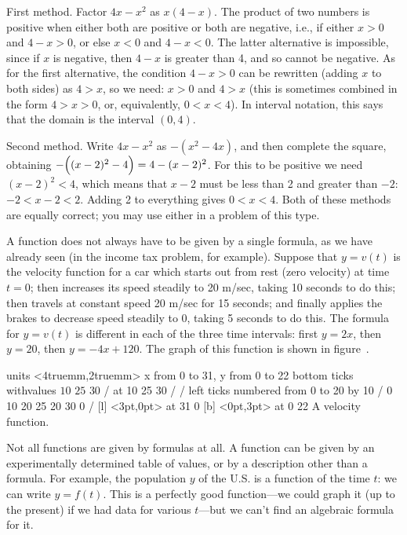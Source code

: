 {\txtbold First method.} Factor $4x-x^2$ as $x(4-x)$.  The product of two numbers
is positive when either both are positive or both are negative, i.e., if
either $x>0$ and $4-x>0$, or else $x<0$ and $4-x<0$.  The latter alternative
is impossible, since if $x$ is negative, then $4-x$ is greater than 4, and
so cannot be negative.  As for the first alternative, the condition $4-x>0$
can be rewritten (adding $x$ to both sides) as $4>x$, so we need:
$x>0$ and $4>x$ (this is sometimes combined in the form $4>x>0$, or,
equivalently, $0<x<4$).  In interval notation, this says that the domain
is the interval $(0,4)$.

{\txtbold Second method.}  Write $4x-x^2$ as $-(x^2-4x)$, and then complete
the square, obtaining $-\Bigl((x-2)^2-4\Bigr)=4-(x-2)^2$.  For this
to be positive we need $(x-2)^2<4$, which means that $x-2$ must be less
than 2 and greater than $-2$:  $-2<x-2<2$.  Adding 2 to everything gives
$0<x<4$.  Both of these methods are equally correct; you may use either
in a problem of this type.
\endexample

A function does not always have to be given by a single formula, as we
have already seen (in the income tax problem, for example).  
Suppose that $y=v(t)$ is the velocity function for a car
which starts out from rest (zero velocity) at time $t=0$; then
increases its speed steadily to 20 m/sec, taking 10 seconds to do
this; then travels at constant speed 20 m/sec for 15 seconds; and
finally applies the brakes to decrease speed steadily to 0, taking 5
seconds to do this.  The formula for $y=v(t)$ is different in each of
the three time intervals: first $y=2x$, then $y=20$, then $y=-4x+120$.
The graph of this function is shown in figure~.

\figure
\texonly
\vbox{\beginpicture
\normalgraphs
\ninepoint
\setcoordinatesystem units <4truemm,2truemm>
\setplotarea x from 0 to 31, y from 0 to 22
\axis bottom ticks withvalues {$10$} {$25$} {$30$} / at 10 25 30 / /
\axis left ticks numbered from 0 to 20 by 10 /
 0 10 20 25 20 30 0 /
 [l] <3pt,0pt> at 31 0
 [b] <0pt,3pt> at 0 22
\endpicture}
\endtexonly
{}
\begincaption
A velocity function.
\endcaption
\endfigure

Not all functions are given by formulas at all.  A function can be
given by an experimentally determined table of values, or by a
description other than a formula.  For example, the population $y$ of
the U.S. is a function of the time $t$: we can write $y=f(t)$.  This
is a perfectly good function---we could graph it (up to the
present) if we had data for various $t$---but we can't find an
algebraic formula for it.

